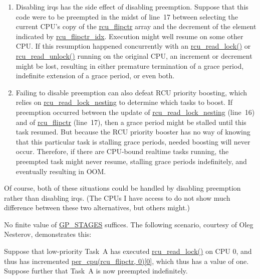 
\begin{enumerate}
\item	Disabling irqs has the side effect of disabling preemption.
	Suppose that this code were to be preempted in the midst
	of line~17 between selecting the current CPU's copy
	of the \url{rcu_flipctr} array and the decrement of
	the element indicated by \url{rcu_flipctr_idx}.
	Execution might well resume on some other CPU.
	If this resumption happened concurrently with an
	\url{rcu_read_lock()} or \url{rcu_read_unlock()}
	running on the original CPU,
	an increment or decrement might be lost, resulting in either
	premature termination of a grace period, indefinite extension
	of a grace period, or even both.
\item	Failing to disable preemption can also defeat RCU priority
	boosting, which relies on \url{rcu_read_lock_nesting}
	to determine which tasks to boost.
	If preemption occurred between the update of
	\url{rcu_read_lock_nesting} (line~16) and of
	\url{rcu_flipctr} (line~17), then a grace
	period might be stalled until this task resumed.
	But because the RCU priority booster has no way of knowing
	that this particular task is stalling grace periods, needed
	boosting will never occur.
	Therefore, if there are CPU-bound realtime tasks running,
	the preempted task might never resume, stalling grace periods
	indefinitely, and eventually resulting in OOM.
\end{enumerate}

Of course, both of these situations could be handled by disabling
preemption rather than disabling irqs.
(The CPUs I have access to do not show much difference between these
two alternatives, but others might.)


No finite value of \url{GP_STAGES} suffices.
The following scenario, courtesy of Oleg Nesterov, demonstrates this:

Suppose that low-priority Task~A has executed
\url{rcu_read_lock()} on CPU 0,
and thus has incremented \url{per_cpu(rcu_flipctr, 0)[0]},
which thus has a value of one.
Suppose further that Task~A is now preempted indefinitely.

